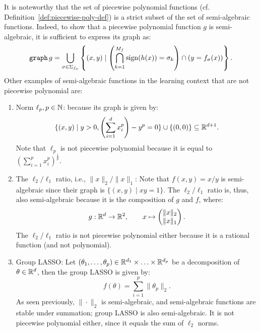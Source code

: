 It is noteworthy that the set of piecewise polynomial functions (cf. Definition~\ref{def:piecewise-poly-def}) is a strict subset of the set of semi-algebraic functions. Indeed, to show that a piecewise polynomial function $g$ is semi-algebraic, it is sufficient to express its graph as:
\begin{equation*}
	\mathtt{graph} \,g = \bigcup_{\sigma \in \Sigma_{f_x}}\left\{(x,y) \mid \left(\bigcap_{k = 1}^{M_f}{\text{sign}}(h(x)) = \sigma_k\right) \cap (y = f_{\sigma}(x))\right\}.
\end{equation*}
Other examples of semi-algebraic functions in the learning context that are not piecewise polynomial are:
\begin{enumerate}[leftmargin=*]
    \item Norm $\ell_p, p \in \mathbb{N}$: because its graph is given by:
    \begin{equation*}
        \{(x,y) \mid y > 0, \left(\sum_{i = 1}^{d} x_i^p\right) - y^p = 0\} \cup \{(0,0)\} \subseteq \mathbb{R}^{d + 1}.
    \end{equation*}
    Note that $\ell_p$ is not piecewise polynomial because it is equal to $(\sum_{i=1}^p x_i^p)^{\frac{1}{p}}$.
    \item The $\ell_2/\ell_1$ ratio, i.e., $\|x\|_2/\|x\|_1$: Note that $f(x,y) = x/y$ is semi-algebraic since their graph is $\{(x,y) \mid xy = 1\}$. The $\ell_2/\ell_1$ ratio is, thus, also semi-algebraic because it is the composition of $g$ and $f$, where:
    \begin{equation*}
        g: \mathbb{R}^d \to \mathbb{R}^2, \qquad  x \mapsto \begin{pmatrix}
            \|x\|_2 \\ \|x\|_1
        \end{pmatrix}.
    \end{equation*}
    The $\ell_2/\ell_1$ ratio is not piecewise polynomial either because it is a rational function (and not polynomial).
    \item Group LASSO: Let $(\theta_1, \ldots, \theta_p) \in \mathbb{R}^{d_1} \times \ldots \times \mathbb{R}^{d_p}$ be a decomposition of $\theta \in \mathbb{R}^d$, then the group LASSO is given by:
    \begin{equation*}
        f(\theta) = \sum_{i = 1}^p \|\theta_p\|_2.
    \end{equation*}
    As seen previously, $\|\cdot\|_2$ is semi-algebraic, and semi-algebraic functions are stable under summation; group LASSO is also semi-algebraic. It is not piecewise polynomial either, since it equals the sum of $\ell_2$ norms.
\end{enumerate}
